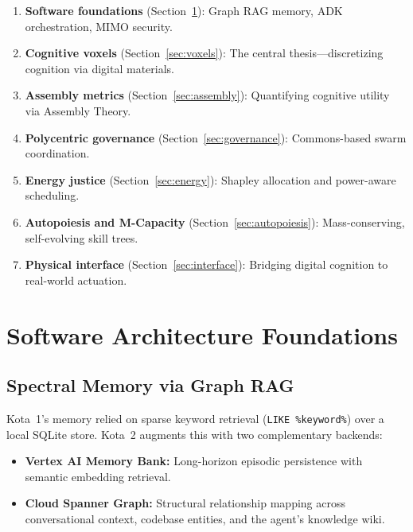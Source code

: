 \documentclass[11pt,a4paper]{article}
\begin{document}
\begin{enumerate}
    \item \textbf{Software foundations} (Section~\ref{sec:software}): Graph RAG memory, ADK orchestration, MIMO security.
    \item \textbf{Cognitive voxels} (Section~\ref{sec:voxels}): The central thesis---discretizing cognition via digital materials.
    \item \textbf{Assembly metrics} (Section~\ref{sec:assembly}): Quantifying cognitive utility via Assembly Theory.
    \item \textbf{Polycentric governance} (Section~\ref{sec:governance}): Commons-based swarm coordination.
    \item \textbf{Energy justice} (Section~\ref{sec:energy}): Shapley allocation and power-aware scheduling.
    \item \textbf{Autopoiesis and M-Capacity} (Section~\ref{sec:autopoiesis}): Mass-conserving, self-evolving skill trees.
    \item \textbf{Physical interface} (Section~\ref{sec:interface}): Bridging digital cognition to real-world actuation.
\end{enumerate}

\section{Software Architecture Foundations}
\label{sec:software}

\subsection{Spectral Memory via Graph RAG}

Kota~1's memory relied on sparse keyword retrieval (\texttt{LIKE \%keyword\%}) over a local SQLite store. Kota~2 augments this with two complementary backends:

\begin{itemize}
    \item \textbf{Vertex AI Memory Bank:} Long-horizon episodic persistence with semantic embedding retrieval.
    \item \textbf{Cloud Spanner Graph:} Structural relationship mapping across conversational context, codebase entities, and the agent's knowledge wiki.
\end{itemize}
\end{document}
